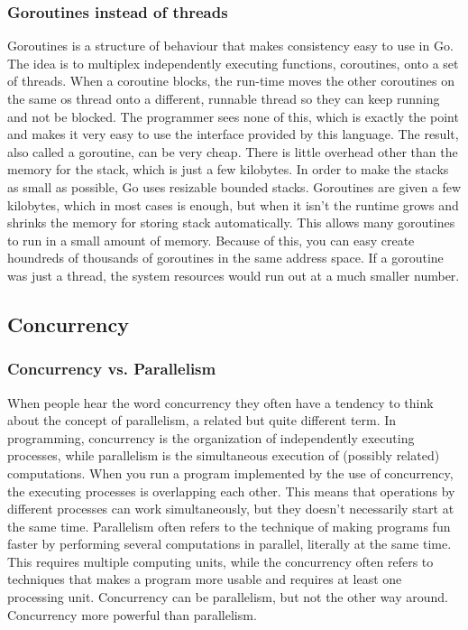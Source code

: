 \documentclass[12pt, a4paper, oneside]{article}
\begin{document}
\subsubsection{Goroutines instead of threads}
Goroutines is a structure of behaviour that makes consistency easy to use in Go. The idea is to multiplex independently executing functions, coroutines, onto a set of threads. When a coroutine blocks, the run-time moves the other coroutines on the same os thread onto a different, runnable thread so they can keep running and not be blocked. The programmer sees none of this, which is exactly the point and makes it very easy to use the interface provided by this language. 
The result, also called a goroutine, can be very cheap. There is little overhead other than the memory for the stack, which is just a few kilobytes.
In order to make the stacks as small as possible, Go uses resizable bounded stacks. Goroutines are given a few kilobytes, which in most cases is enough, but when it isn’t  the runtime grows and shrinks the memory for storing stack automatically. This allows many goroutines to run in a small amount of memory. 
Because of this, you can easy create houndreds of thousands of goroutines in the same address space. If a goroutine was just a thread, the system resources would run out at a much smaller number.

\subsection{Concurrency}
\subsubsection{Concurrency vs. Parallelism}
When people hear the word concurrency they often have a tendency to think about the concept of parallelism, a related but quite different term. In programming, concurrency is the organization of independently executing processes, while parallelism is the simultaneous execution of (possibly related) computations. 
When you run a program implemented by the use of concurrency, the executing processes is overlapping each other. This means that operations by different processes can work simultaneously, but they doesn't necessarily start at the same time. 
Parallelism often refers to the technique of making programs fun faster by performing several computations in parallel, literally at the same time. This requires multiple computing units, while the concurrency often refers to techniques that makes a program more usable and requires at least one processing unit. 
Concurrency can be parallelism, but not the other way around.
Concurrency more powerful than parallelism.
\end{document}

